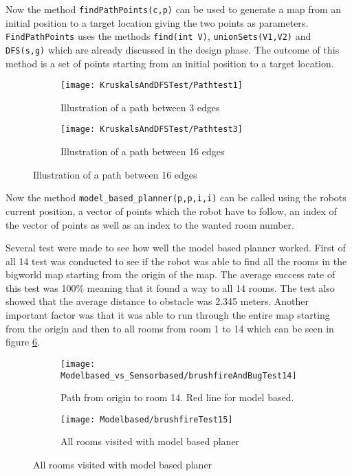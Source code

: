 \documentclass[../Head/Main.tex]{subfiles}
\begin{document}
Now the method \texttt{findPathPoints(c,p)} can be used to generate a map from an initial position to a target location giving the two points as parameters. \texttt{FindPathPoints} uses the methods \texttt{find(int V)}, \texttt{unionSets(V1,V2)} and \texttt{DFS(s,g)} which are already discussed in the design phase. The outcome of this method is a set of points starting from an initial position to a target location.        
  \begin{figure}[H]
   \begin{subfigure}[b]{0.49\textwidth}
    \centering
    \texttt{[image: KruskalsAndDFSTest/Pathtest1]}
    \caption{Illustration of a path between 3 edges}
    \label{fig:Vertexes}
  \end{subfigure}
  \hfill
   \begin{subfigure}[b]{0.49\textwidth}
    \centering
    \texttt{[image: KruskalsAndDFSTest/Pathtest3]}
    \caption{Illustration of a path between 16 edges}
    \label{fig:VertexesAndEdges}
  \end{subfigure}
  \end{figure}  

Now the method \texttt{model\_based\_planner(p,p,i,i)} can be called using the robots current position, a vector of points which the robot have to follow, an index of the vector of points as well as an index to the wanted room number. 

Several test were made to see how well the model based planner worked. First of all 14 test was conducted to see if the robot was able to find all the rooms in the bigworld map starting from the origin of the map. The average success rate of this test was 100\% meaning that it found a way to all 14 rooms. The test also showed that the average distance to obstacle was 2.345 meters. Another important factor was that it was able to run through the entire map starting from the origin and then to all rooms from room 1 to 14 which can be seen in figure \ref{fig:brushfireCompletePath}. 

  \begin{figure}[H]
   \begin{subfigure}[b]{0.49\textwidth}
    \centering
    \texttt{[image: Modelbased\_vs\_Sensorbased/brushfireAndBugTest14]}
    \caption{Path from origin to room 14. Red line for model based.}
    \label{fig:brushfireToRoom14}
  \end{subfigure}
  \hfill
   \begin{subfigure}[b]{0.49\textwidth}
    \centering
    \texttt{[image: Modelbased/brushfireTest15]}
    \caption{All rooms visited with model based planer}
    \label{fig:brushfireCompletePath}
  \end{subfigure}
  \end{figure}  
\end{document}
